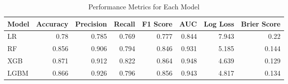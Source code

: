 \begin{table}[H]\centering
\caption{Performance Metrics for Each Model}
\label{Table 3 :performance_metrics}
\begin{tabular}{lrrrrrrr}
\toprule
Model & Accuracy & Precision & Recall & F1 Score & AUC & Log Loss & Brier Score \\
\midrule
LR & 0.78 & 0.785 & 0.769 & 0.777 & 0.844 & 7.943 & 0.22 \\
RF & 0.856 & 0.906 & 0.794 & 0.846 & 0.931 & 5.185 & 0.144 \\
XGB & 0.871 & 0.912 & 0.822 & 0.864 & 0.948 & 4.639 & 0.129 \\
LGBM & 0.866 & 0.926 & 0.796 & 0.856 & 0.943 & 4.817 & 0.134 \\
\bottomrule
\end{tabular}
\end{table}
